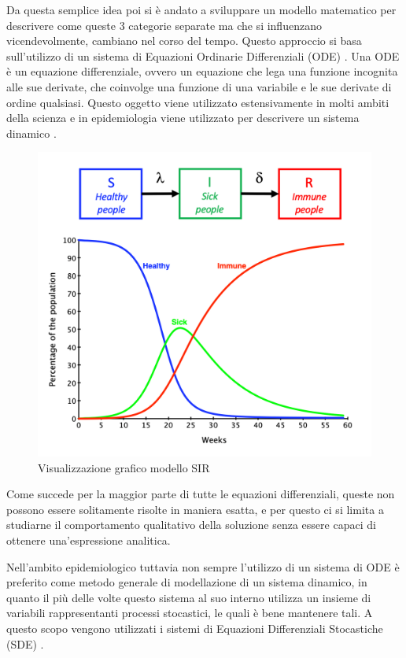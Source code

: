 Da questa semplice idea poi si è andato a sviluppare un modello
matematico per descrivere come queste 3 categorie separate ma 
che si influenzano vicendevolmente, cambiano nel corso del tempo.
Questo approccio si basa sull'utilizzo di un sistema di Equazioni 
Ordinarie Differenziali (ODE) \cite{Brauer2008}. Una ODE è
un equazione differenziale, ovvero un equazione che lega 
una funzione incognita alle sue derivate, che coinvolge una 
funzione di una variabile e le sue derivate di ordine qualsiasi.
Questo oggetto viene utilizzato estensivamente in molti ambiti 
della scienza e in epidemiologia viene utilizzato per 
descrivere un sistema dinamico \cite{wiki:Equazione_differenziale_ordinaria}. 

\begin{figure}[h]
    \includegraphics[width=\linewidth]{img/SIR-model.png}
    \caption{Visualizzazione grafico modello SIR} 
    \label{fig:SIR_model_graphic}
\end{figure}

Come succede per la maggior parte di tutte le equazioni 
differenziali, queste non possono essere solitamente 
risolte in maniera esatta, e per questo ci si limita a 
studiarne il comportamento qualitativo della soluzione 
senza essere capaci di ottenere una'espressione analitica.

Nell'ambito epidemiologico tuttavia non sempre l'utilizzo
di un sistema di ODE è preferito come metodo generale di 
modellazione di un sistema dinamico, in quanto il più 
delle volte questo sistema al suo interno utilizza un 
insieme di variabili rappresentanti processi stocastici, le quali 
è bene mantenere tali. A questo scopo vengono utilizzati i 
sistemi di Equazioni Differenziali Stocastiche (SDE) \cite{Allen2008}.

